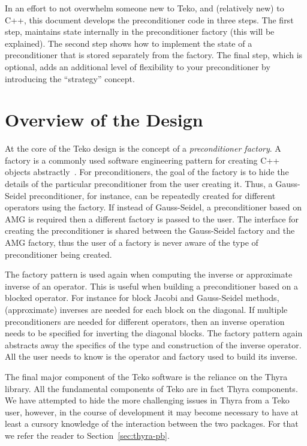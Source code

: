 \documentclass[12pt]{article}
\begin{document}
In an effort to not overwhelm someone new to Teko,
and (relatively new) to C++, this document develops the preconditioner code in
three steps. The first step, maintains state internally
in the preconditioner factory (this will be explained).
The second step shows how to implement the state of
a preconditioner that is stored separately from the factory.
The final step, which is optional, adds an additional
level of flexibility to your preconditioner by introducing
the ``strategy'' concept.

\section{Overview of the Design}\label{sec:design-overview}
At the core of the Teko design is the concept of a \emph{preconditioner
factory}. A factory is a commonly used software engineering
pattern for creating C++ objects abstractly~\cite{Go4-DesignPatterns}.
For preconditioners, the goal of the factory is to hide the details
of the particular preconditioner from the user creating it. Thus, 
a Gauss-Seidel preconditioner, for instance, can be repeatedly created
for different operators using the factory. If instead of Gauss-Seidel,
a preconditioner based on AMG is required then a different factory
is passed to the user. The interface for creating the preconditioner
is shared between the Gauss-Seidel factory and the AMG factory, thus
the user of a factory is never aware of the type of preconditioner being
created.

The factory pattern is used again when computing the inverse or approximate
inverse of an operator. This is useful when building a preconditioner based
on a blocked operator. For instance for block Jacobi and Gauss-Seidel methods,
(approximate) inverses are needed for each block on the diagonal. If multiple
preconditioners are needed for different operators, then an inverse operation
needs to be specified for inverting the diagonal blocks. The factory pattern
again abstracts away the specifics of the type and construction of the inverse
operator. All the user needs to know is the operator and factory used to build 
its inverse.

The final major component of the Teko software is the reliance on the Thyra
library. All the fundamental components of Teko are in fact Thyra components. 
We have attempted to hide the more challenging issues in Thyra from
a Teko user, however, in the course of development it may become necessary
to have at least a cursory knowledge of the interaction between the two
packages. For that we refer the reader to Section~\ref{sec:thyra-pb}.
\end{document}
